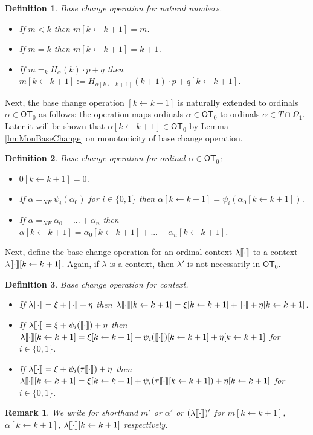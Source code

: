 \documentclass{amsart}
\theoremstyle{plain}
\theoremstyle{plain}
\newtheorem{remark}[theorem]{Remark}
\newtheorem*{definition}{Definition}
\def\scbrl{[\hspace{-.14em}[}
\def\scbrr{]\hspace{-.14em}]}
\def\scbr#1{\scbrl#1\scbrr}
\newcommand\OT{\mathsf{OT}}
\newcommand{\kp}{[k\leftarrow k+1]}
\newcommand{\Om}{{\Omega}}
\newcommand{\al}{{\alpha}}
\newcommand{\la}{\lambda}
\def\scbrl{[\hspace{-.14em}[}
\def\scbrr{]\hspace{-.14em}]}
\def\scbr#1{\scbrl#1\scbrr}
\begin{document}
\begin{definition}Base change operation for natural numbers.
\begin{itemize}
    \item If $m<k$ then $m\kp=m$. 
    \item If $m=k$ then $m\kp=k+1$.
    \item If $m=_{k} H_\al(k)\cdot p + q$ then $m\kp:=H_{\al\kp} (k+1)\cdot p + q\kp$.\\
\end{itemize}
\end{definition}

Next, the base change operation $\kp$ is naturally extended to ordinals $\al \in \OT_0$ as follows: the operation maps ordinals $\al \in \OT_0$ to ordinals $\al \in T\cap \Om_1$. Later it will be shown that $\al\kp \in \OT_0$ by Lemma \ref{lm:MonBaseChange} on monotonicity of base change operation.


\begin{definition}Base change operation for ordinal $\al \in \OT_0$;
\begin{itemize}
    \item $0\kp =0$.
    \item If $\al =_{NF} \psi_i(\al_0)$  for $i \in \{0,1\}$ then $\al\kp = \psi_i(\al_0\kp)$.
    \item If $\al =_{NF} \al_0 +...+\al_n $ then $\al\kp=\al_0\kp +...+ \al_n\kp$.\\
\end{itemize}
\end{definition}
Next, define the base change operation for an ordinal context $\la\scbr{\cdot}$  to a context $\la\scbr{\cdot}\kp$. Again, if $\la$ is a context, then $\la'$ is not necessarily in $\OT_0$.

\begin{definition}Base change operation for context.%
\begin{itemize}
    \item If $\la\scbr{\cdot}=\xi+ \scbr{\cdot} + \eta$ then 
    $\la\scbr{\cdot}\kp=\xi\kp+ \scbr{\cdot}+ \eta\kp$. 
    
    \item If $\la\scbr{\cdot}=\xi+ \psi_i(\scbr{\cdot}) + \eta$ then 
    $\la\scbr{\cdot}\kp=\xi\kp+ \psi_i(\scbr{\cdot})\kp+ \eta\kp$ for $i \in \{0,1\}$.
    
    \item If $\la\scbr{\cdot}=\xi+ \psi_i(\tau{\scbr{\cdot}})+\eta$ then \\
    $\la\scbr{\cdot}\kp=\xi\kp+ \psi_i(\tau{\scbr{\cdot}\kp})+\eta\kp$ for $i \in \{0,1\}$.
    
\end{itemize}
\end{definition}
\begin{remark}{\em We write for shorthand $m'$ or $\al'$ or $(\la\scbr{\cdot})'$ for  $m\kp$, $\al\kp$, $\la\scbr{\cdot}\kp$ respectively.} \\
\end{remark}
\end{document}

